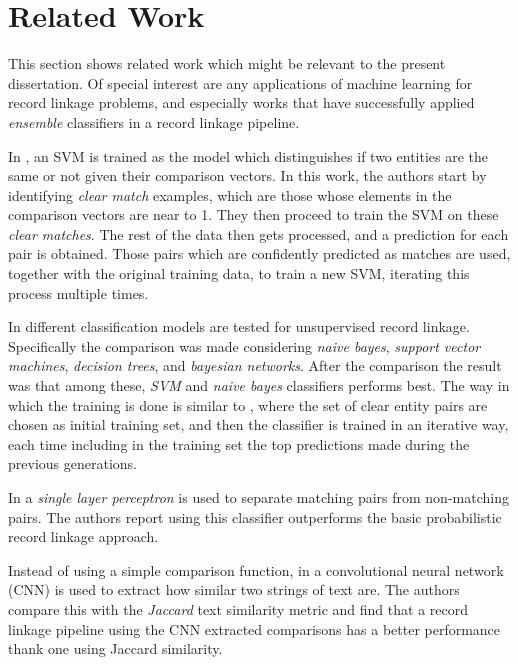 \documentclass[epsfig,a4paper,11pt,titlepage,twoside,openany]{book}
\begin{document}
\section{Related Work}
\label{sec:rl-related-work}

This section shows related work which might be relevant to the present dissertation. Of special interest are any applications of machine learning for record linkage problems, and especially works that have successfully applied \textit{ensemble} classifiers in a record linkage pipeline. 

In \cite{Christen:2008_svm}, an SVM is trained as the model which distinguishes if two entities are the same or not given their comparison vectors. In this work, the authors start by identifying \textit{clear match} examples, which are those whose elements in the comparison vectors are near to 1. They then proceed to train the SVM on these \textit{clear matches}. The rest of the data then gets processed, and a prediction for each pair is obtained. Those pairs which are confidently predicted as matches are used, together with the original training data, to train a new SVM, iterating this process multiple times.

In \cite{ektefa2011comparative} different classification models are tested for unsupervised record linkage. Specifically the comparison was made considering \textit{naive bayes}, \textit{support vector machines}, \textit{decision trees}, and \textit{bayesian networks}. After the comparison the result was that among these, \textit{SVM} and \textit{naive bayes} classifiers performs best. The way in which the training is done is similar to \cite{Christen:2008_svm}, where the set of clear entity pairs are chosen as initial training set, and then the classifier is trained in an iterative way, each time including in the training set the top predictions made during the previous generations. 

In \cite{Wilson2011_slp_in_rl} a \textit{single layer perceptron} is used to separate matching pairs from non-matching pairs. The authors report using this classifier outperforms the basic probabilistic record linkage approach.

Instead of using a simple comparison function, in \cite{gottapu2016entity} a convolutional neural network (CNN) is used to extract how similar two strings of text are. The authors compare this with the \textit{Jaccard} text similarity metric and find that a record linkage pipeline using the CNN extracted comparisons has a better performance thank one using Jaccard similarity. 
\end{document}

